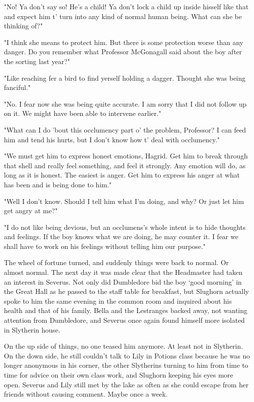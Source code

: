 "No! Ya don't say so! He's a child! Ya don't lock a child up inside hisself like that and expect him t' turn into any kind of normal human being. What can she be thinking of?"

"I think she means to protect him. But there is some protection worse than any danger. Do you remember what Professor McGonagall said about the boy after the sorting last year?"

"Like reaching fer a bird to find yerself holding a dagger. Thought she was being fanciful."

"No. I fear now she was being quite accurate. I am sorry that I did not follow up on it. We might have been able to intervene earlier."

"What can I do 'bout this occlumency part o' the problem, Professor? I can feed him and tend his hurts, but I don't know how t' deal with occlumency."

"We must get him to express honest emotions, Hagrid. Get him to break through that shell and really feel something, and feel it strongly. Any emotion will do, as long as it is honest. The easiest is anger. Get him to express his anger at what has been and is being done to him."

"Well I don't know. Should I tell him what I'm doing, and why? Or just let him get angry at me?"

"I do not like being devious, but an occlumens's whole intent is to hide thoughts and feelings. If the boy knows what we are doing, he may counter it. I fear we shall have to work on his feelings without telling him our purpose."

The wheel of fortune turned, and suddenly things were back to normal. Or almost normal. The next day it was made clear that the Headmaster had taken an interest in Severus. Not only did Dumbledore bid the boy `good morning' in the Great Hall as he passed to the staff table for breakfast, but Slughorn actually spoke to him the same evening in the common room and inquired about his health and that of his family. Bella and the Lestranges backed away, not wanting attention from Dumbledore, and Severus once again found himself more isolated in Slytherin house.

On the up side of things, no one teased him anymore. At least not in Slytherin. On the down side, he still couldn't talk to Lily in Potions class because he was no longer anonymous in his corner, the other Slytherins turning to him from time to time for advice on their own class work, and Slughorn keeping his eyes more open. Severus and Lily still met by the lake as often as she could escape from her friends without causing comment. Maybe once a week.

